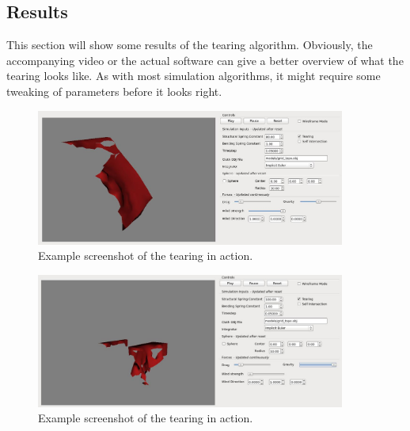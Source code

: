 \subsection{Results}
This section will show some results of the tearing algorithm. Obviously, the accompanying video or the actual software can give a better overview of what the tearing looks like. As with most simulation algorithms, it might require some tweaking of parameters before it looks right.

\begin{figure}[!htb]
  \centering
  \includegraphics[width=4in,natwidth=366,natheight=166]{img/tornUp1.jpg}
  \caption
   {Example screenshot of the tearing in action.}
\end{figure}

\begin{figure}[!htb]
  \centering
  \includegraphics[width=4in,natwidth=366,natheight=166]{img/tornUp2.jpg}
  \caption
   {Example screenshot of the tearing in action.}
\end{figure}


\ifx\isEmbedded\undefined


\pagebreak

\fi